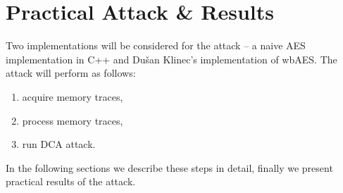 \chapter{Practical Attack \& Results}
\label{chap:results}

Two implementations will be considered for the attack -- a naive AES implementation in C++ and Dušan Klinec's implementation of wbAES. The attack will perform as follows:
\begin{enumerate}
	\item acquire memory traces,
	\item process memory traces,
	\item run DCA attack.
\end{enumerate}
In the following sections we describe these steps in detail, finally we present practical results of the attack.








